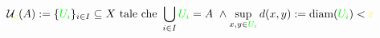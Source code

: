 \documentclass[preview]{standalone}
\begin{document}
\begin{align*}
\mathcal{U}_{\textcolor{yellow}{\varepsilon}}(A) := \{\textcolor{green}{U_i}\}_{i \in I} \subseteq X \text{ tale che } \bigcup_{i \in I} \textcolor{green}{U_i} = A \ \land \sup_{x,y \in \textcolor{green}{U_i}} d(x,y) := \text{diam}(\textcolor{green}{U_i}) < \textcolor{yellow}{\varepsilon}
\end{align*}
\end{document}
